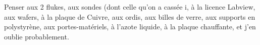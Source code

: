 Penser aux 2 flukes, aux sondes (dont celle qu'on a cassée ^^), à la licence Labview, aux wafers, à la plaque de Cuivre, aux ordis, aux billes de verre, aux supports en polystyrène, aux portes-matériels, à l'azote liquide, à la plaque chauffante, et j'en oublie probablement.
